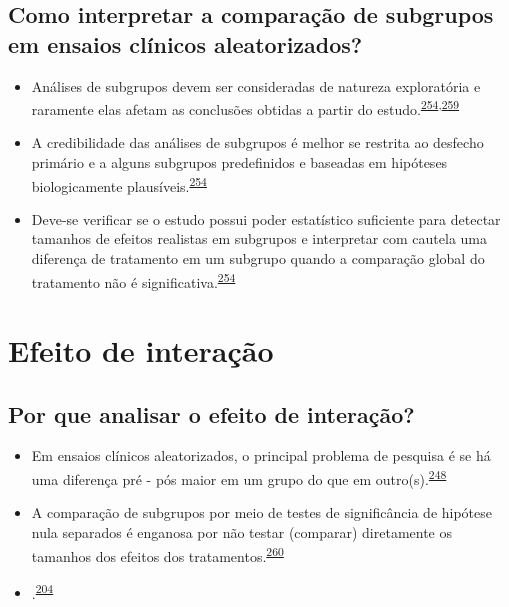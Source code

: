\documentclass[
  a4paper,
]{book}
\providecommand{\tightlist}{%
  \setlength{\itemsep}{0pt}\setlength{\parskip}{0pt}}
\begin{document}
\hypertarget{como-interpretar-a-comparauxe7uxe3o-de-subgrupos-em-ensaios-cluxednicos-aleatorizados}{%
\subsection{Como interpretar a comparação de subgrupos em ensaios clínicos aleatorizados?}\label{como-interpretar-a-comparauxe7uxe3o-de-subgrupos-em-ensaios-cluxednicos-aleatorizados}}

\begin{itemize}
\tightlist
\item
  Análises de subgrupos devem ser consideradas de natureza exploratória e raramente elas afetam as conclusões obtidas a partir do estudo.\textsuperscript{\protect\hyperlink{ref-Assmann2000}{254},\protect\hyperlink{ref-Brookes2004}{259}}
\end{itemize}

\begin{itemize}
\item
  A credibilidade das análises de subgrupos é melhor se restrita ao desfecho primário e a alguns subgrupos predefinidos e baseadas em hipóteses biologicamente plausíveis.\textsuperscript{\protect\hyperlink{ref-Assmann2000}{254}}
\item
  Deve-se verificar se o estudo possui poder estatístico suficiente para detectar tamanhos de efeitos realistas em subgrupos e interpretar com cautela uma diferença de tratamento em um subgrupo quando a comparação global do tratamento não é significativa.\textsuperscript{\protect\hyperlink{ref-Assmann2000}{254}}
\end{itemize}

\hypertarget{interacao}{%
\section{Efeito de interação}\label{interacao}}

\hypertarget{por-que-analisar-o-efeito-de-interauxe7uxe3o}{%
\subsection{Por que analisar o efeito de interação?}\label{por-que-analisar-o-efeito-de-interauxe7uxe3o}}

\begin{itemize}
\item
  Em ensaios clínicos aleatorizados, o principal problema de pesquisa é se há uma diferença pré - pós maior em um grupo do que em outro(s).\textsuperscript{\protect\hyperlink{ref-bland2011}{248}}
\item
  A comparação de subgrupos por meio de testes de significância de hipótese nula separados é enganosa por não testar (comparar) diretamente os tamanhos dos efeitos dos tratamentos.\textsuperscript{\protect\hyperlink{ref-Matthews1996}{260}}
\item
  .\textsuperscript{\protect\hyperlink{ref-Bours2023}{204}}
\end{itemize}
\end{document}
